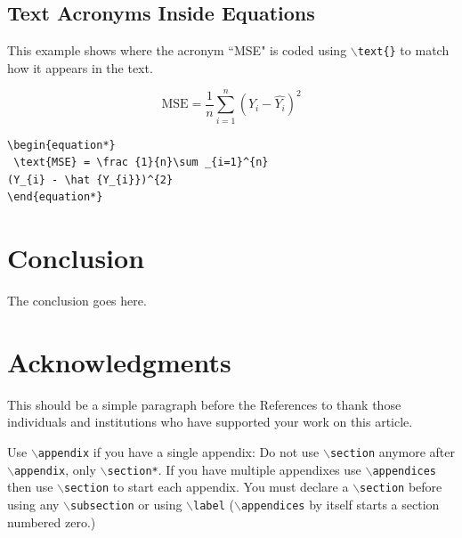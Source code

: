 \documentclass[lettersize,journal]{IEEEtran}
\begin{document}
\subsection{ Text Acronyms Inside Equations}
This example shows where the acronym ``MSE" is coded using $\backslash${\tt{text\{\}}} to match how it appears in the text.

\begin{equation*}
 \text{MSE} = \frac {1}{n}\sum _{i=1}^{n}(Y_{i} - \hat {Y_{i}})^{2}
\end{equation*}

\begin{verbatim}
\begin{equation*}
 \text{MSE} = \frac {1}{n}\sum _{i=1}^{n}
(Y_{i} - \hat {Y_{i}})^{2}
\end{equation*}
\end{verbatim}

\section{Conclusion}
The conclusion goes here.


\section*{Acknowledgments}
This should be a simple paragraph before the References to thank those individuals and institutions who have supported your work on this article.



{
Use $\backslash${\tt{appendix}} if you have a single appendix:
Do not use $\backslash${\tt{section}} anymore after $\backslash${\tt{appendix}}, only $\backslash${\tt{section*}}.
If you have multiple appendixes use $\backslash${\tt{appendices}} then use $\backslash${\tt{section}} to start each appendix.
You must declare a $\backslash${\tt{section}} before using any $\backslash${\tt{subsection}} or using $\backslash${\tt{label}} ($\backslash${\tt{appendices}} by itself
 starts a section numbered zero.)}



\end{document}
